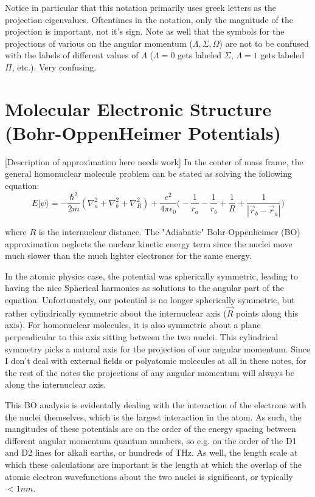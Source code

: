 \documentclass[prl, longbibliography]{revtex4-2}
\begin{document}
Notice in particular that this notation primarily uses greek letters as the projection eigenvalues. Oftentimes in the notation, only the magnitude of the projection is important, not it's sign. Note as well that the symbols for the projections of various on the angular momentum ($\Lambda, \Sigma, \Omega$) are not to be confused with the labels of different values of $\Lambda$ ($\Lambda=0$ gets labeled $\Sigma$, $\Lambda=1$ gets labeled $\Pi$, etc.). Very confusing. 

\section{Molecular Electronic Structure (Bohr-OppenHeimer Potentials)}

[Description of approximation here needs work] In the center of mass frame, the general homonuclear molecule problem can be stated as solving the following equation:
$$
E|\psi\rangle = -\frac{\hbar^2}{2m}(\nabla_a^2+\nabla_b^2 +\nabla_{R}^2) + \frac{e^2}{4\pi\epsilon_0} \Big(-\frac{1}{r_a} -\frac{1}{r_b} + \frac{1}{R} + \frac{1}{|\vec{r}_b-\vec{r}_a|}\Big)
$$

where $R$ is the internuclear distance. The "Adiabatic" Bohr-Oppenheimer (BO) approximation neglects the nuclear kinetic energy term since the nuclei move much slower than the much lighter electroncs for the same energy. 

In the atomic physics case, the potential was spherically symmetric, leading to having the nice Spherical harmonics as solutions to the angular part of the equation. Unfortunately, our potential is no longer spherically symmetric, but rather cylindrically symmetric about the internuclear axis ($\vec{R}$ points along this axis). For homonuclear molecules, it is also symmetric about a plane perpendicular to this axis sitting between the two nuclei. This cylindrical symmetry picks a natural axis for the projection of our angular momentum. Since I don't deal with external fields or polyatomic molecules at all in these notes, for the rest of the notes the projections of any angular momentum will always be along the internuclear axis.

This BO analysis is evidentally dealing with the interaction of the electrons with the nuclei themselves, which is the largest interaction in the atom. As such, the mangitudes of these potentials are on the order of the energy spacing between different angular momentum quantum numbers, so e.g. on the order of the D1 and D2 lines for alkali earths, or hundreds of THz. As well, the length scale at which these calculations are important is the length at which the overlap of the atomic electron wavefunctions about the two nuclei is significant, or typically $< 1nm$.
\end{document}
